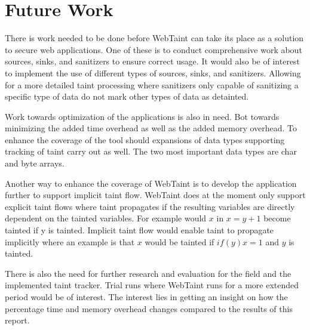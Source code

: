 \chapter{Future Work}
There is work needed to be done before WebTaint can take its place as a solution to secure web applications. One of these is to conduct comprehensive work about sources, sinks, and sanitizers to ensure correct usage. It would also be of interest to implement the use of different types of sources, sinks, and sanitizers. Allowing for a more detailed taint processing where sanitizers only capable of sanitizing a specific type of data do not mark other types of data as detainted. 

Work towards optimization of the applications is also in need. Bot towards minimizing the added time overhead as well as the added memory overhead. To enhance the coverage of the tool should expansions of data types supporting tracking of taint carry out as well. The two most important data types are char and byte arrays. 

Another way to enhance the coverage of WebTaint is to develop the application further to support implicit taint flow. WebTaint does at the moment only support explicit taint flows where taint propagates if the resulting variables are directly dependent on the tainted variables. For example would $ x $ in $ x = y + 1 $ become tainted if y is tainted. Implicit taint flow would enable taint to propagate implicitly where an example is that $ x $ would be tainted if $ if (y) x = 1 $ and $ y $ is tainted.

There is also the need for further research and evaluation for the field and the implemented taint tracker. Trial runs where WebTaint runs for a more extended period would be of interest. The interest lies in getting an insight on how the percentage time and memory overhead changes compared to the results of this report.
